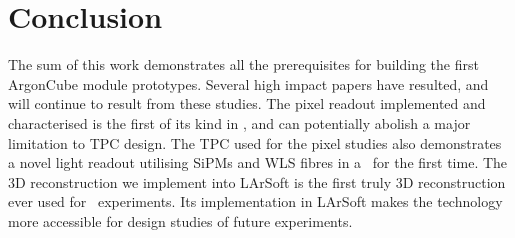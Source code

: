 \chapter{Conclusion}
\label{chap:conclusion}

The sum of this work demonstrates all the prerequisites for building the first ArgonCube module prototypes.
Several high impact papers have resulted, and will continue to result from these studies.
The pixel readout implemented and characterised is the first of its kind in \lar, and can potentially abolish a major limitation to TPC design.
The TPC used for the pixel studies also demonstrates a novel light readout utilising SiPMs and WLS fibres in a \lartpc\ for the first time.
The 3D reconstruction we implement into LArSoft is the first truly 3D reconstruction ever used for \lar\ experiments.
Its implementation in LArSoft makes the technology more accessible for design studies of future experiments.